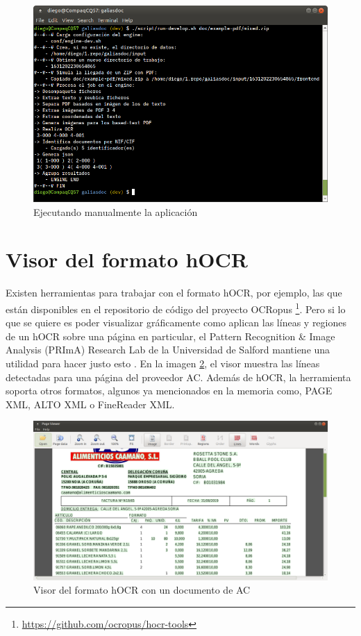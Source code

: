 \begin{figure}[hp!]
    \centering
    \includegraphics[width=1.0\textwidth]{imaxes/z-adicional/run-develop}
    \caption{Ejecutando manualmente la aplicación}
    \label{fig:ejecucion-manual}
\end{figure}

\section{Visor del formato hOCR}

Existen herramientas para trabajar con el formato hOCR, por ejemplo, las que están disponibles en el repositorio de código del proyecto OCRopus \footnote{\url{https://github.com/ocropus/hocr-tools}}. Pero si lo que se quiere es poder visualizar gráficamente como aplican las líneas y regiones de un hOCR sobre una página en particular, el Pattern Recognition \& Image Analysis (PRImA) Research Lab de la Universidad de Salford mantiene una utilidad para hacer justo esto \cite{prima_tool_page_viewer}. En la imagen \ref{fig:visor-formato-hocr}, el visor muestra las líneas detectadas para una página del proveedor AC. Además de hOCR, la herramienta soporta otros formatos, algunos ya mencionados en la memoria como, PAGE XML, ALTO XML o FineReader XML.

\begin{figure}[hp!]
    \centering
    \includegraphics[width=1.0\textwidth]{imaxes/z-adicional/visor-hocr.png}
    \caption{Visor del formato hOCR con un documento de AC}
    \label{fig:visor-formato-hocr}
\end{figure}

